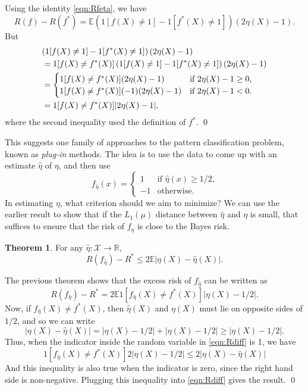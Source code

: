 \documentclass[twoside]{article}
\theoremstyle{definition}
\newtheorem{thm}{Theorem}[section]
\newenvironment{pf}{{\noindent\sc Proof. }}{\qed}
\theoremstyle{definition}
\theoremstyle{remark}
\def\R{{\mathbb R}}
\def\X{{\mathcal X}}
\def\E{{\mathbb E}}
\begin{document}
\begin{pf}
  Using the identity \eqref{eqn:Rfeta}, we have
    \[
      R(f) - R(f^*) = \E \left(1[f(X)\not =1]
          -1[f^*(X)\not=1]\right)(2\eta(X)-1).
    \]
  But
    \begin{align*}
      \lefteqn{\left(1[f(X)\not =1]
          -1[f^*(X)\not=1]\right)(2\eta(X)-1)} & \\
      & = 1[f(X)\not=f^*(X)] \left(1[f(X)\not =1]
          -1[f^*(X)\not=1]\right)(2\eta(X)-1) \\
      & = \begin{cases}
          1[f(X)\not =f^*(X)] (2\eta(X)-1) & \text{if $2\eta(X)-1\ge 0$,}\\
          1[f(X)\not =f^*(X)] (-1) (2\eta(X)-1) & \text{if $2\eta(X)-1< 0$.}
	  \end{cases} \\
      & = 1[f(X)\not=f^*(X)] |2\eta(X)-1|,
    \end{align*}
  where the second inequality used the definition of $f^*$.
\end{pf}

This suggests one family of approaches to the pattern classification
problem, known as {\em plug-in} methods. The idea is to use the data
to come up with an estimate $\hat\eta$ of $\eta$, and then use
  \[
    f_{\hat\eta}(x) = \begin{cases}
    1 & \text{if $\hat\eta(x)\ge 1/2$,} \\
    -1& \text{otherwise.} \end{cases}
  \]
In estimating $\eta$, what criterion should we aim to minimize? We can
use the earlier result to show that if the
$L_1(\mu)$ distance between $\hat\eta$ and $\eta$ is small, that
suffices to ensure that the risk of $f_{\hat\eta}$ is close to the
Bayes risk.

\begin{thm}
  For any $\hat\eta:\X\to\R$,
    \[
      R(f_{\hat\eta}) - R^* \le 2\E\left|\eta(X)-\hat\eta(X)\right|.
    \]
\end{thm}

\begin{pf}
  The previous theorem shows that the excess risk of $f_{\hat\eta}$
  can be written as
    \begin{equation}\label{eqn:Rdiff}
      R(f_{\hat\eta})-R^*
        = 2\E 1[f_{\hat\eta}(X)\not=f^*(X)]|\eta(X)-1/2|.
    \end{equation}
  Now, if $f_{\hat\eta}(X)\not=f^*(X)$, then $\hat\eta(X)$ and
  $\eta(X)$ must lie on opposite sides of $1/2$, and so we can write
    \[
      |\eta(X)-\hat\eta(X)| = |\eta(X)-1/2| + |\hat\eta(X)-1/2|
      \ge|\eta(X)-1/2|.
    \]
  Thus, when the indicator inside the random variable in
  \eqref{eqn:Rdiff} is 1, we have
    \[
      1[f_{\hat\eta}(X)\not=f^*(X)]2 |\eta(X)-1/2|
      \le 2|\eta(X)-\hat\eta(X)|
    \]
  And this inequality is also true when the indicator is zero, since
  the right hand side is non-negative. Plugging this inequality into
  \eqref{eqn:Rdiff} gives the result.
\end{pf}
\end{document}
